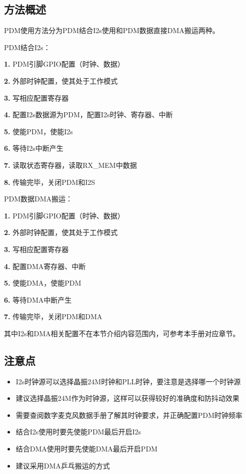 \documentclass[
  12pt,
]{book}
\begin{document}
\hypertarget{ux65b9ux6cd5ux6982ux8ff0-3}{%
\subsection{方法概述}\label{ux65b9ux6cd5ux6982ux8ff0-3}}

PDM使用方法分为PDM结合I2s使用和PDM数据直接DMA搬运两种。

PDM结合I2s：

\textbf{1.} PDM引脚GPIO配置（时钟、数据）

\textbf{2.} 外部时钟配置，使其处于工作模式

\textbf{3.} 写相应配置寄存器

\textbf{4.} 配置I2s数据源为PDM，配置I2s时钟、寄存器、中断

\textbf{5.} 使能PDM，使能I2s

\textbf{6.} 等待I2s中断产生

\textbf{7.} 读取状态寄存器，读取RX\_MEM中数据

\textbf{8.} 传输完毕，关闭PDM和I2S

PDM数据DMA搬运：

\textbf{1.} PDM引脚GPIO配置（时钟、数据）

\textbf{2.} 外部时钟配置，使其处于工作模式

\textbf{3.} 写相应配置寄存器

\textbf{4.} 配置DMA寄存器、中断

\textbf{5.} 使能DMA，使能PDM

\textbf{6.} 等待DMA中断产生

\textbf{7.} 传输完毕，关闭PDM和DMA

其中I2s和DMA相关配置不在本节介绍内容范围内，可参考本手册对应章节。

\hypertarget{ux6ce8ux610fux70b9-3}{%
\subsection{注意点}\label{ux6ce8ux610fux70b9-3}}

\begin{itemize}
\item
  I2s时钟源可以选择晶振24M时钟和PLL时钟，要注意是选择哪一个时钟源
\item
  建议选择晶振24M作为时钟源，这样可以获得较好的准确度和防抖动效果
\item
  需要查阅数字麦克风数据手册了解其时钟要求，并正确配置PDM时钟频率
\item
  结合I2s使用时要先使能PDM最后开启I2s
\item
  结合DMA使用时要先使能DMA最后开启PDM
\item
  建议采用DMA乒乓搬运的方式
\end{itemize}
\end{document}
